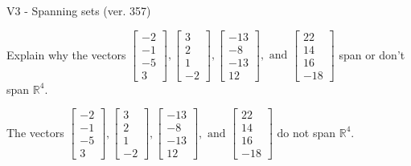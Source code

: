 \begin{exercise}
  \begin{exerciseTitle}V3 - Spanning sets (ver. 357)\end{exerciseTitle}
  \begin{exerciseStatement}
    Explain why the vectors \(\left[\begin{array}{r}
-2 \\
-1 \\
-5 \\
3
\end{array}\right] , \left[\begin{array}{r}
3 \\
2 \\
1 \\
-2
\end{array}\right] , \left[\begin{array}{r}
-13 \\
-8 \\
-13 \\
12
\end{array}\right] , \text{ and } \left[\begin{array}{r}
22 \\
14 \\
16 \\
-18
\end{array}\right]\) span or don't span \(\mathbb{R}^4\). 
	


  \end{exerciseStatement}
  \begin{exerciseAnswer}
   The vectors \(\left[\begin{array}{r}
-2 \\
-1 \\
-5 \\
3
\end{array}\right] , \left[\begin{array}{r}
3 \\
2 \\
1 \\
-2
\end{array}\right] , \left[\begin{array}{r}
-13 \\
-8 \\
-13 \\
12
\end{array}\right] , \text{ and } \left[\begin{array}{r}
22 \\
14 \\
16 \\
-18
\end{array}\right]\) 
  	 do not  
	span \(\mathbb{R}^4\).
  


  \end{exerciseAnswer}
\end{exercise}